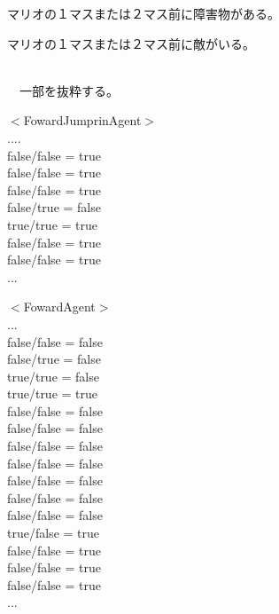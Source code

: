 \documentclass[a4j]{jarticle}
\begin{document}
\begin{description}
\begin{description}
\begin{description}
      \item マリオの１マスまたは２マス前に障害物がある。
      \item マリオの１マスまたは２マス前に敵がいる。
      \end{description}
  \end{description}
\item[(3)]~\\
　一部を抜粋する。
　\begin{screen}
$<$FowardJumprinAgent$>$\\
 ....\\
false/false = true\\
false/false = true\\
false/false = true\\
false/true = false\\
true/true = true\\
false/false = true\\
false/false = true\\
...\\
  \end{screen}
  \begin{screen}
$<$FowardAgent$>$\\
...\\
false/false = false\\
false/true = false\\
true/true = false\\
true/true = true\\
false/false = false\\
false/false = false\\
false/false = false\\
false/false = false\\
false/false = false\\
false/false = false\\
false/false = false\\
true/false = true\\
false/false = true\\
false/false = true\\
false/false = true\\
...\\
  \end{screen}
\end{description}

\end{document}
